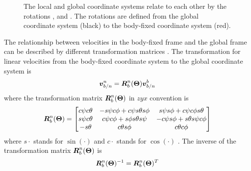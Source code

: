 \begin{figure}
    \caption{The local and global coordinate systems relate to each other by the rotations \yawAngle, \pitchAngle and \rollAngle. The rotations are defined from the global coordinate system (black) to the body-fixed coordinate system (red).} 
    \label{fig:coordinate_frames}
\end{figure}

The relationship between velocities in the body-fixed frame and the global frame can be described by different transformation matrices \citep{fossen2011}.
The transformation for linear velocities from the body-fixed coordinate system to the global coordinate system is 
\begin{equation}
\boldsymbol{v}^n_{b/n} = \boldsymbol{R}^n_b(\boldsymbol{\Theta}) \boldsymbol{v}^b_{b/n}
\end{equation}
where the transformation matrix $\boldsymbol{R}^n_b(\boldsymbol{\Theta})$ in $zyx$ convention is 
\begin{equation}
\boldsymbol{R}^n_b(\boldsymbol{\Theta}) =\begin{bmatrix}
 c\psi c\theta & -s\psi c\phi + c\psi s\theta s\phi & s\psi s\phi + c\psi c\phi s \theta \\
 s\psi c\theta & c\psi c\phi + s\phi  s\theta s\psi & -c\psi s\phi + s\theta s\psi c\phi \\
 -s\theta & c\theta s\phi & c\theta c\phi
 \end{bmatrix} 
\end{equation}
where $s\cdot$ stands for $\sin(\cdot)$ and $c\cdot$ stands for $\cos(\cdot)$ \citep[p. 22]{fossen2011}. The inverse of the transformation matrix $\boldsymbol{R}^n_b(\boldsymbol{\Theta})$ is
\begin{equation}
\boldsymbol{R}^n_b(\boldsymbol{\Theta})^{-1} = \boldsymbol{R}^n_b(\boldsymbol{\Theta})^T
\end{equation}

